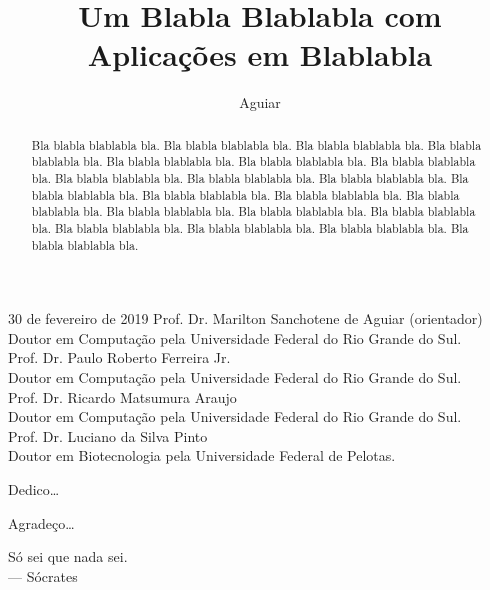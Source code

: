\documentclass[diss,capa]{texufpel}
\title{Um Blabla Blablabla com Aplicações em Blablabla}
\author{Aguiar}{Marilton Sanchotene de}
\begin{document}

\maketitle 

\sloppy

\fichacatalografica

\begin{aprovacao}{30 de fevereiro de 2019} %
\noindent Prof. Dr. Marilton Sanchotene de Aguiar (orientador)\\
Doutor em Computação pela Universidade Federal do Rio Grande do Sul.\\[1cm]

\noindent Prof. Dr. Paulo Roberto Ferreira Jr.\\
Doutor em Computação pela Universidade Federal do Rio Grande do Sul.\\[1cm]

\noindent Prof. Dr. Ricardo Matsumura Araujo\\
Doutor em Computação pela Universidade Federal do Rio Grande do Sul.\\[1cm]

\noindent Prof. Dr. Luciano da Silva Pinto\\
Doutor em Biotecnologia pela Universidade Federal de Pelotas.
\end{aprovacao}

\begin{dedicatoria}
  Dedico\ldots 
\end{dedicatoria}

\begin{agradecimentos}
  Agradeço\ldots 
\end{agradecimentos}

\begin{epigrafe}
  Só sei que nada sei.\\
  {\sc --- Sócrates}
\end{epigrafe}

\begin{abstract}
Bla blabla blablabla bla.  Bla blabla blablabla bla.  Bla blabla
blablabla bla.  Bla blabla blablabla bla.  Bla blabla blablabla bla.
Bla blabla blablabla bla.  Bla blabla blablabla bla.  Bla blabla
blablabla bla.  Bla blabla blablabla bla.  Bla blabla blablabla bla.
Bla blabla blablabla bla.  Bla blabla blablabla bla.  Bla blabla
blablabla bla.  Bla blabla blablabla bla.  Bla blabla blablabla bla.
Bla blabla blablabla bla.  Bla blabla blablabla bla.  Bla blabla
blablabla bla.  Bla blabla blablabla bla.  Bla blabla blablabla bla.
Bla blabla blablabla bla.
\end{abstract}
\end{document}
